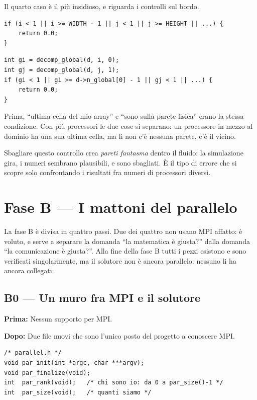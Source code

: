 \documentclass[11pt,a4paper]{article}
\newcommand{\prima}[1]{\par\smallskip\noindent\textbf{\color{scuro}Prima:} #1\par}
\newcommand{\dopo}[1]{\par\smallskip\noindent\textbf{\color{scuro}Dopo:} #1\par\smallskip}
\newcommand{\etichetta}[1]{\par\smallskip\noindent{\small\bfseries\color{scuro}#1}\par\vspace{-4pt}}
\begin{document}
Il quarto caso è il più insidioso, e riguarda i controlli sul bordo.

\etichetta{Prima}
\begin{lstlisting}
if (i < 1 || i >= WIDTH - 1 || j < 1 || j >= HEIGHT || ...) {
    return 0.0;
}
\end{lstlisting}

\etichetta{Dopo}
\begin{lstlisting}
int gi = decomp_global(d, i, 0);
int gj = decomp_global(d, j, 1);
if (gi < 1 || gi >= d->n_global[0] - 1 || gj < 1 || ...) {
    return 0.0;
}
\end{lstlisting}

Prima, ``ultima cella del mio array'' e ``sono sulla parete fisica'' erano la
stessa condizione. Con più processori le due cose si separano: un processore in
mezzo al dominio ha una sua ultima cella, ma lì non c'è nessuna parete, c'è il
vicino.

Sbagliare questo controllo crea \emph{pareti fantasma} dentro il fluido: la
simulazione gira, i numeri sembrano plausibili, e sono sbagliati. È il tipo di
errore che si scopre solo confrontando i risultati fra numeri di processori
diversi.

\section{Fase B --- I mattoni del parallelo}

La fase B è divisa in quattro passi. Due dei quattro non usano MPI affatto:
è voluto, e serve a separare la domanda ``la matematica è giusta?'' dalla
domanda ``la comunicazione è giusta?''. Alla fine della fase B tutti i pezzi
esistono e sono verificati singolarmente, ma il solutore non è ancora
parallelo: nessuno li ha ancora collegati.

\subsection*{B0 --- Un muro fra MPI e il solutore}

\prima{Nessun supporto per MPI.}
\dopo{Due file nuovi che sono l'unico posto del progetto a conoscere MPI.}

\begin{lstlisting}
/* parallel.h */
void par_init(int *argc, char ***argv);
void par_finalize(void);
int  par_rank(void);   /* chi sono io: da 0 a par_size()-1 */
int  par_size(void);   /* quanti siamo */
\end{lstlisting}
\end{document}
